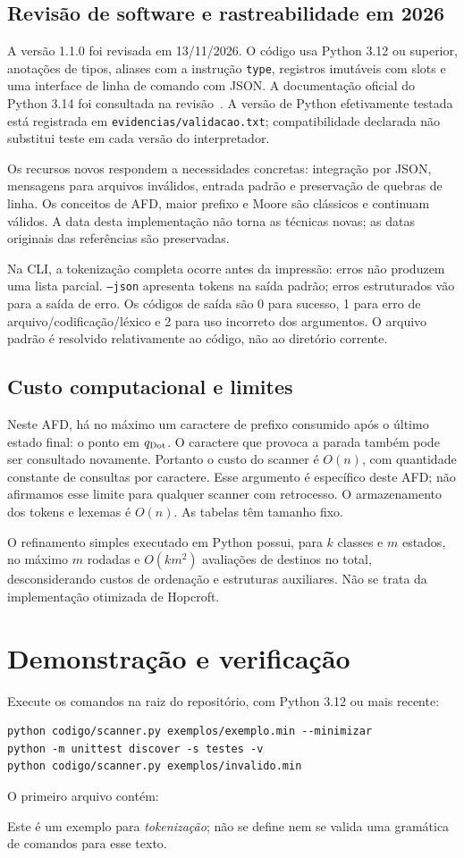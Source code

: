 \documentclass[12pt,a4paper]{article}
\begin{document}
\subsection{Revisão de software e rastreabilidade em 2026}
A versão 1.1.0 foi revisada em 13/11/2026. O código usa Python 3.12 ou superior,
anotações de tipos, aliases com a instrução \texttt{type}, registros imutáveis
com slots e uma interface de linha de comando com JSON. A documentação oficial
do Python 3.14 foi consultada na revisão~\cite{pythonatual}. A versão de Python
efetivamente testada está registrada em \texttt{evidencias/validacao.txt};
compatibilidade declarada não substitui teste em cada versão do interpretador.

Os recursos novos respondem a necessidades concretas: integração por JSON,
mensagens para arquivos inválidos, entrada padrão e preservação de quebras de
linha. Os conceitos de AFD, maior prefixo e Moore são clássicos e continuam
válidos. A data desta implementação não torna as técnicas novas; as datas
originais das referências são preservadas.

Na CLI, a tokenização completa ocorre antes da impressão: erros não produzem
uma lista parcial. \texttt{--json} apresenta tokens na saída padrão; erros
estruturados vão para a saída de erro. Os códigos de saída são 0 para sucesso,
1 para erro de arquivo/codificação/léxico e 2 para uso incorreto dos argumentos.
O arquivo padrão é resolvido relativamente ao código, não ao diretório corrente.

\subsection{Custo computacional e limites}
Neste AFD, há no máximo um caractere de prefixo consumido após o último estado
final: o ponto em $q_{\mathrm{Dot}}$. O caractere que provoca a parada também pode ser
consultado novamente. Portanto o custo do scanner é $O(n)$, com quantidade
constante de consultas por caractere. Esse argumento é específico deste AFD;
não afirmamos esse limite para qualquer scanner com retrocesso.
O armazenamento dos tokens e lexemas é $O(n)$. As tabelas têm tamanho fixo.

O refinamento simples executado em Python possui, para $k$ classes e $m$
estados, no máximo $m$ rodadas e $O(km^2)$ avaliações de destinos no total,
desconsiderando custos de ordenação e estruturas auxiliares. Não se trata da
implementação otimizada de Hopcroft.

\section{Demonstração e verificação}
Execute os comandos na raiz do repositório, com Python 3.12 ou mais recente:
\begin{lstlisting}[language={}]
python codigo/scanner.py exemplos/exemplo.min --minimizar
python -m unittest discover -s testes -v
python codigo/scanner.py exemplos/invalido.min
\end{lstlisting}
O primeiro arquivo contém:

Este é um exemplo para \emph{tokenização}; não se define nem se valida uma
gramática de comandos para esse texto.
\end{document}
